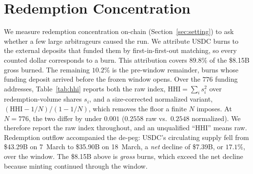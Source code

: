 \section{Redemption Concentration}
\label{app:hhi}

We measure redemption concentration on-chain (Section~\ref{sec:setting}) to ask whether a
few large arbitrageurs caused the run. We attribute USDC burns to the external deposits that
funded them by first-in-first-out matching, so every counted dollar corresponds to a burn.
This attribution covers $89.8\%$ of the \$8.15B gross burned. The remaining $10.2\%$
is the pre-window remainder, burns whose funding deposit arrived before the frozen
window opens. Over the $776$ funding addresses,
Table~\ref{tab:hhi} reports both the raw index, $\mathrm{HHI}=\sum_i s_i^2$ over
redemption-volume shares $s_i$, and a size-corrected normalized variant,
$(\mathrm{HHI}-1/N)/(1-1/N)$, which removes the floor a finite $N$ imposes. At $N=776$, the two
differ by under $0.001$ ($0.2558$ raw vs.\ $0.2548$ normalized). We therefore report the raw index
throughout, and an unqualified ``HHI'' means raw. Redemption outflow accompanied the de-peg: USDC's circulating supply fell from
\$43.29B on 7~March to \$35.90B on 18~March, a \emph{net} decline of \$7.39B, or $17.1\%$, over
the window. The \$8.15B above is \emph{gross} burns, which exceed the net decline because
minting continued through the window.

\begin{table}[t]
\centering
\caption{Redemption concentration, with an entity-resolved block. The top block reports
address-level figures, and the entity-resolved block joins the 776 funding addresses
against two public label sets (dawsbot/eth-labels, brianleect/etherscan-labels), which
together resolve 2 of 776 addresses: the larger conduit (40.9\% of volume) carries an
external Coinbase label, and the smaller (28.6\%) does not, so its Coinbase attribution
rests on the paper's own on-chain tracing. At this coverage no entity holds two or more of
the 776 addresses, so entity HHI equals address HHI to full precision, which means the
label evidence is too sparse to test the no-sybil condition.}
\label{tab:hhi}
\small
\checkwidth{\small}

\end{table}

